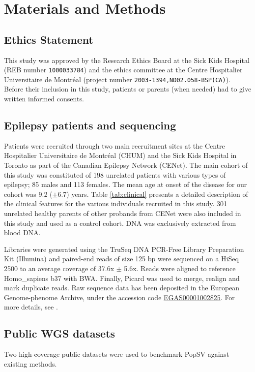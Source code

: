 \section{Materials and Methods}

\subsection*{Ethics Statement}
This study was approved by the Research Ethics Board at the Sick Kids Hospital (REB number \verb!1000033784!) and the ethics committee at the Centre Hospitalier Universitaire de Montr\'eal (project number \verb!2003-1394,ND02.058-BSP(CA)!).
Before their inclusion in this study, patients or parents (when needed) had to give written informed consents.

\subsection*{Epilepsy patients and sequencing}
Patients were recruited through two main recruitment sites at the Centre Hospitalier Universitaire de Montr\'eal (CHUM) and the Sick Kids Hospital in Toronto as part of the Canadian Epilepsy Network (CENet).
The main cohort of this study was constituted of 198 unrelated patients with various types of epilepsy; 85 males and 113 females.
The mean age at onset of the disease for our cohort was 9.2 ($\pm$6.7) years.
Table \ref{tab:clinical} presents a detailed description of the clinical features for the various individuals recruited in this study.
301 unrelated healthy parents of other probands from CENet were also included in this study and used as a control cohort.
DNA was exclusively extracted from blood DNA.

Libraries were generated using the TruSeq DNA PCR-Free Library Preparation Kit (Illumina) and paired-end reads of size 125 bp were sequenced on a HiSeq 2500 to an average coverage of 37.6x $\pm$ 5.6x.
Reads were aligned to reference Homo\_sapiens b37 with {\sf BWA}\cite{Li2010}.
Finally, Picard was used to merge, realign and mark duplicate reads.
Raw sequence data has been deposited in the European Genome-phenome Archive, under the accession code \href{https://www.ebi.ac.uk/ega/studies/EGAS00001002825}{EGAS00001002825}.
For more details, see .

\subsection*{Public WGS datasets}
Two high-coverage public datasets were used to benchmark {\sf PopSV} against existing methods.

